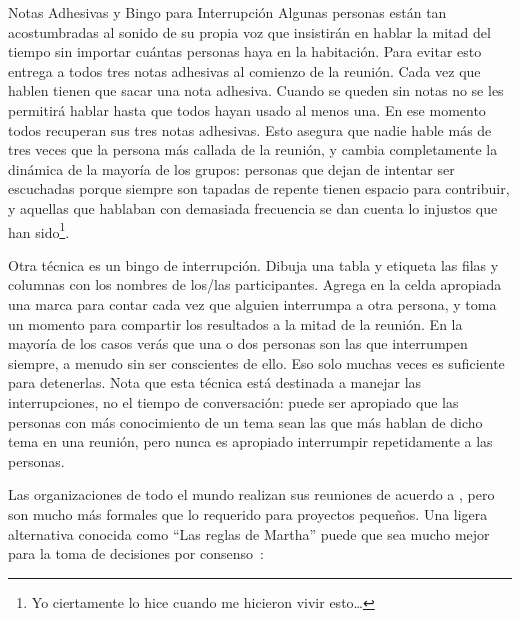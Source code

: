 \begin{aside}{Notas Adhesivas y Bingo para Interrupción}
  Algunas personas están tan acostumbradas al sonido de su propia voz
  que insistirán en hablar la mitad del tiempo
  sin importar cuántas personas haya en la habitación.
  Para evitar esto
  entrega a todos tres notas adhesivas al comienzo de la reunión.
  Cada vez que hablen
  tienen que sacar una nota adhesiva.
  Cuando se queden sin notas
  no se les permitirá hablar hasta que todos hayan usado al menos una.
  En ese momento todos recuperan sus tres notas adhesivas.
  Esto asegura que nadie hable más de tres veces que
  la persona más callada de la reunión,
  y cambia completamente la dinámica de la mayoría de los grupos:
  personas que dejan de intentar ser escuchadas porque siempre son tapadas
  de repente tienen espacio para contribuir,
  y aquellas que hablaban con demasiada frecuencia se dan cuenta lo injustos que han sido\footnote{
    Yo ciertamente lo hice cuando me hicieron vivir esto{\ldots}
  }.

  Otra técnica es un bingo de interrupción.
  Dibuja una tabla y etiqueta las filas y columnas con los nombres de los/las participantes.
  Agrega en la celda apropiada una marca para contar 
  cada vez que alguien interrumpa a otra persona,
  y toma un momento para compartir los resultados a la mitad de la reunión.
  En la mayoría de los casos
  verás que una o dos personas son las que interrumpen siempre,
  a menudo sin ser conscientes de ello.
  Eso solo muchas veces es suficiente para detenerlas.
  Nota que esta técnica está destinada a manejar las interrupciones,
  no el tiempo de conversación:
  puede ser apropiado que las personas con más conocimiento de un tema 
  sean las que más hablan de dicho tema en una reunión,
  pero nunca es apropiado interrumpir repetidamente a las personas.
\end{aside}


Las organizaciones de todo el mundo realizan sus reuniones de acuerdo a 
,
pero son mucho más formales que lo requerido para proyectos pequeños.
Una ligera alternativa conocida como ``Las reglas de Martha''
puede que sea mucho mejor para la toma de decisiones por consenso~\cite{Mina1986}:

